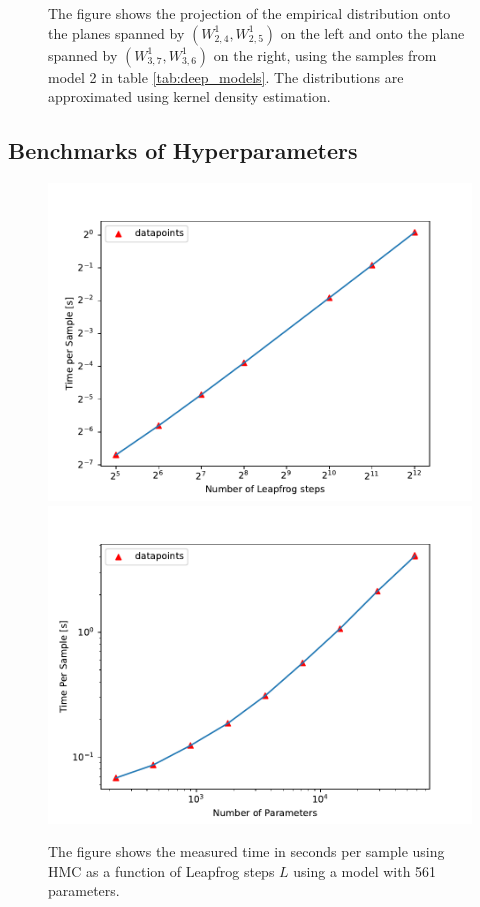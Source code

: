 \begin{figure}
    \caption{The figure shows the projection of the empirical distribution onto the planes spanned by $(W_{2,4}^1, W_{2,5}^1)$ on the left and onto the plane spanned by $(W_{3,7}^1, W_{3, 6}^1)$ on the right, using the samples from model 2 in table \ref{tab:deep_models}. The distributions are approximated using kernel density estimation. 
    }
    \label{fig:posterior_kernels}
\end{figure}


\subsection{Benchmarks of Hyperparameters}\label{subsec:benchmarks}
\begin{figure}
    \centering
    \includegraphics[scale=0.7]{figures/computational_cost/time_vs_leapfrogsteps_hmc.pdf}
    \includegraphics[scale=0.7]{figures/computational_cost/time_vs_params.pdf}
    \caption{The figure shows the measured time in seconds per sample using HMC as a function of Leapfrog steps $L$ using a model with
    561 parameters.
    }
    \label{fig:time_vs_leapfrogsteps}
\end{figure}

